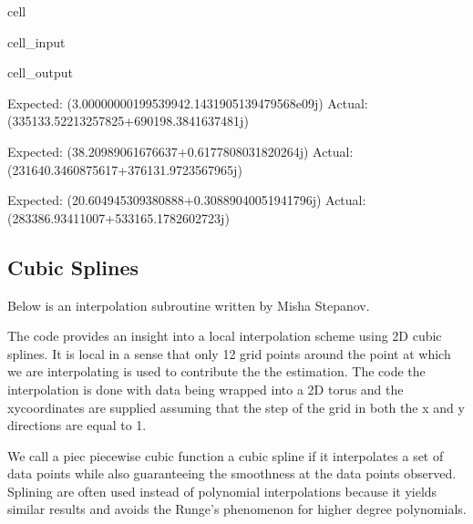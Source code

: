 \documentclass[letterpaper,10pt,english]{jupyterBook}
\begin{document}
\begin{sphinxuseclass}{cell}
\begin{sphinxVerbatimInput}
\begin{sphinxuseclass}{cell_input}
\end{sphinxuseclass}\end{sphinxVerbatimInput}
\begin{sphinxVerbatimOutput}

\begin{sphinxuseclass}{cell_output}
\begin{sphinxVerbatim}[commandchars=\\\{\}]
Expected: (3.0000000019953994\PYGZhy{}2.1431905139479568e\PYGZhy{}09j) 
Actual: (\PYGZhy{}335133.52213257825+690198.3841637481j)

Expected: (38.20989061676637+0.6177808031820264j) 
Actual: (\PYGZhy{}231640.3460875617+376131.9723567965j)

Expected:  (20.604945309380888+0.30889040051941796j) 
Actual: (\PYGZhy{}283386.93411007+533165.1782602723j)
\end{sphinxVerbatim}

\end{sphinxuseclass}\end{sphinxVerbatimOutput}

\end{sphinxuseclass}

\subsection{Cubic Splines}
\label{\detokenize{interpolation:cubic-splines}}
\sphinxAtStartPar
Below is an interpolation subroutine written by Misha Stepanov.

\sphinxAtStartPar
The code provides an insight into a local interpolation scheme using 2D cubic splines. It is local in a sense that only 12 grid points around the point at which we are interpolating is used to contribute the the estimation. The code the interpolation is done with data being wrapped into a 2D torus and the xy\sphinxhyphen{}coordinates are supplied assuming that the step of the grid in both the x and y directions are equal to 1.

\sphinxAtStartPar
We call a piec piecewise cubic function a cubic spline if it interpolates a set of data points while also guaranteeing the smoothness at the data points observed. Splining are often used instead of polynomial interpolations because it yields similar results and avoids the Runge’s phenomenon for higher degree polynomials.
\end{document}
